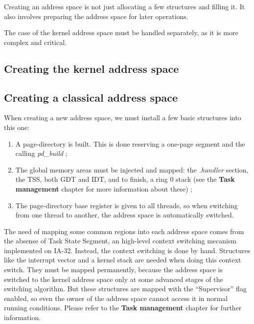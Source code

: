 Creating an address space is not just allocating a few structures and
filling it. It also involves preparing the address space for later
operations.

The case of the kernel address space must be handled separately, as it
is more complex and critical.

%
%

\subsection{Creating the kernel address space}

%
%

\subsection{Creating a classical address space}

When creating a new address space, we must install a few basic
structures into this one:

\begin{enumerate}
\item A page-directory is built. This is done reserving a one-page
segment and the calling \textit{pd\_build} ;
\item The global memory areas must be injected and mapped: the
\textit{.handler} section, the TSS, both GDT and IDT, and to finish, a
ring 0 stack (see the \textbf{Task management} chapter for more
information about these) ;
\item The page-directory base register is given to all threads, so
when switching from one thread to another, the address space is
automatically switched.
\end{enumerate}

The need of mapping some common regions into each address space comes
from the absense of Task State Segment, an high-level context
switching mecanism implemented on IA-32. Instead, the context
switching is done by hand. Structures like the interrupt vector and a
kernel stack are needed when doing this context switch. They must be
mapped permanently, because the address space is switched to the
kernel address space only at some advanced stages of the switching
algorithm. But these structures are mapped with the ``Supervisor''
flag enabled, so even the owner of the address space cannot access it
in normal running conditions. Please refer to the \textbf{Task
management} chapter for further information.

